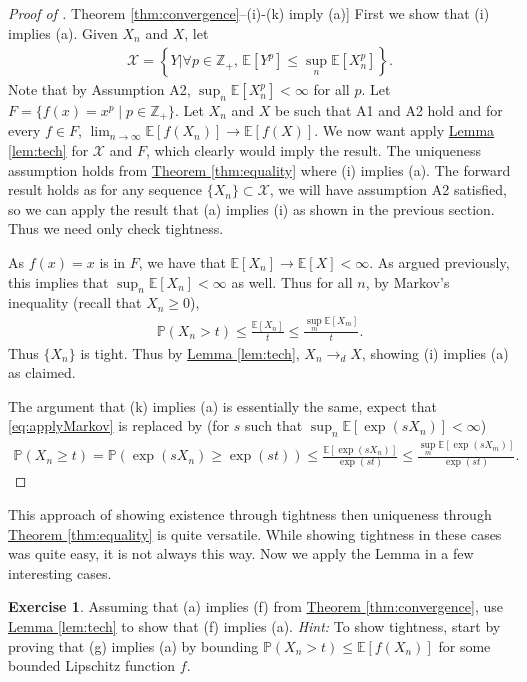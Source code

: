 \documentclass{article}
\theoremstyle{definition}
\newtheorem{exercise}{Exercise}
\renewcommand{\P}{\mathbb P}
\newcommand{\E}{\mathbb E}
\newcommand{\1}{\mathbb I}
\newcommand{\Z}{\mathbb Z}
\newcommand{\thmhref}[1]{\hyperref[#1]{Theorem \ref{#1}}}
\newcommand{\lemhref}[1]{\hyperref[#1]{Lemma \ref{#1}}}
\begin{document}
\begin{proof}[Proof of \thmhref{thm:convergence}--(i)-(k) imply (a)]
  First we show that (i) implies (a).  Given $X_n$ and $X$, let
  \begin{align*}
    \mathcal X = \left\{Y \mathrel{\bigg \vert} \forall p \in \Z_+,\, \E[Y^p] \leq \sup_n\E[X_n^p]\right\}.
  \end{align*}
  Note that by Assumption A2, $\sup_n\E[X_n^p] < \infty$ for all $p$.
  Let $F = \{f(x) = x^p \mid p \in \Z_+\}$.  Let $X_n$ and $X$ be such
  that A1 and A2 hold and for every $f \in F$, $\lim_{n \to \infty}
  \E[f(X_n)] \to \E[f(X)]$.  We now want apply \lemhref{lem:tech} for
  $\mathcal X$ and $F$, which clearly would imply the result.  The
  uniqueness assumption holds from \thmhref{thm:equality} where (i)
  implies (a).  The forward result holds as for any sequence $\{X_n\}
  \subset \mathcal X$, we will have assumption A2 satisfied, so we can
  apply the result that (a) implies (i) as shown in the previous
  section.  Thus we need only check tightness.

  As $f(x) = x$ is in $F$, we have that $\E[X_n] \to \E[X] < \infty$.
  As argued previously, this implies that $\sup_n \E[X_n] < \infty$ as
  well.  Thus for all $n$, by Markov's inequality (recall that $X_n
  \geq 0$),
  \begin{align}
    \label{eq:applyMarkov}
    \P(X_n > t) \leq \frac{\E[X_n]}{t} \leq \frac{\sup_m \E[X_m]}{t}.
  \end{align}
  Thus $\{X_n\}$ is tight. Thus by \lemhref{lem:tech}, $X_n \to_d X$,
  showing (i) implies (a) as claimed.

  The argument that (k) implies (a) is essentially the same, expect
  that \eqref{eq:applyMarkov} is replaced by (for $s$ such that $\sup_n \E[\exp(sX_n)] <\infty$)
  \begin{align*}
    \P(X_n \geq t) = \P(\exp(s X_n) \geq \exp(s t)) \leq \frac{\E[\exp(sX_n)]}{\exp(s t)} \leq \frac{\sup_m \E[\exp(s X_m)]}{\exp(s t)}.
  \end{align*}
\end{proof}
This approach of showing existence through tightness then uniqueness
through \thmhref{thm:equality} is quite versatile.  While showing
tightness in these cases was quite easy, it is not always this way.
Now we apply the Lemma in a few interesting cases.
\begin{exercise}
  Assuming that (a) implies (f) from \thmhref{thm:convergence}, use
  \lemhref{lem:tech} to show that (f) implies (a).  \emph{Hint:} To
  show tightness, start by proving that (g) implies (a) by bounding
  $\P(X_n > t) \leq \E[f(X_n)]$ for some bounded Lipschitz function
  $f$.
\end{exercise}
\end{document}
